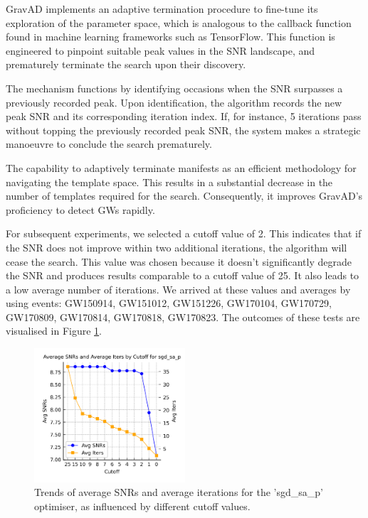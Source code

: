 \documentclass[twocolumn, aps, pra]{revtex4-2}
\begin{document}
	GravAD implements an adaptive termination procedure to fine-tune its exploration of the parameter space, which is analogous to the callback function found in machine learning frameworks such as TensorFlow. This function is engineered to pinpoint suitable peak values in the SNR landscape, and prematurely terminate the search upon their discovery.
	
	The mechanism functions by identifying occasions when the SNR surpasses a previously recorded peak. Upon identification, the algorithm records the new peak SNR and its corresponding iteration index. If, for instance, 5 iterations pass without topping the previously recorded peak SNR, the system makes a strategic manoeuvre to conclude the search prematurely.
	
	The capability to adaptively terminate manifests as an efficient methodology for navigating the template space. This results in a substantial decrease in the number of templates required for the search. Consequently, it improves GravAD's proficiency to detect GWs rapidly.
	
	For subsequent experiments, we selected a cutoff value of 2. This indicates that if the SNR does not improve within two additional iterations, the algorithm will cease the search. This value was chosen because it doesn't significantly degrade the SNR and produces results comparable to a cutoff value of 25. It also leads to a low average number of iterations. We arrived at these values and averages by using events: GW150914, GW151012, GW151226, GW170104, GW170729, GW170809, GW170814, GW170818, GW170823. The outcomes of these tests are visualised in Figure \ref{fig:cutoff}.
	
	\begin{figure}
		\centering
		\includegraphics[width=0.5\textwidth]{cutoff.png}
		\caption{Trends of average SNRs and average iterations for the 'sgd\_sa\_p' optimiser, as influenced by different cutoff values.}
		\label{fig:cutoff}
	\end{figure}
	
\end{document}

